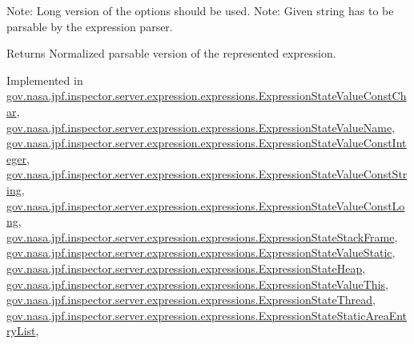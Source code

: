 Note\+: Long version of the options should be used. Note\+: Given string has to be parsable by the expression parser.

\begin{DoxyReturn}{Returns}
Normalized parsable version of the represented expression. 
\end{DoxyReturn}


Implemented in \hyperlink{classgov_1_1nasa_1_1jpf_1_1inspector_1_1server_1_1expression_1_1expressions_1_1_expression_state_value_const_char_a8b8dbff87c3f81b9192355201350b701}{gov.\+nasa.\+jpf.\+inspector.\+server.\+expression.\+expressions.\+Expression\+State\+Value\+Const\+Char}, \hyperlink{classgov_1_1nasa_1_1jpf_1_1inspector_1_1server_1_1expression_1_1expressions_1_1_expression_state_value_name_a7dba9eb7d3fe67b1be856b7c890d14fd}{gov.\+nasa.\+jpf.\+inspector.\+server.\+expression.\+expressions.\+Expression\+State\+Value\+Name}, \hyperlink{classgov_1_1nasa_1_1jpf_1_1inspector_1_1server_1_1expression_1_1expressions_1_1_expression_state_value_const_integer_a49ccad06fcf3443c4f1a0306a007f320}{gov.\+nasa.\+jpf.\+inspector.\+server.\+expression.\+expressions.\+Expression\+State\+Value\+Const\+Integer}, \hyperlink{classgov_1_1nasa_1_1jpf_1_1inspector_1_1server_1_1expression_1_1expressions_1_1_expression_state_value_const_string_af7e58cc61aa1cc6e4e6b00f55f18c293}{gov.\+nasa.\+jpf.\+inspector.\+server.\+expression.\+expressions.\+Expression\+State\+Value\+Const\+String}, \hyperlink{classgov_1_1nasa_1_1jpf_1_1inspector_1_1server_1_1expression_1_1expressions_1_1_expression_state_value_const_long_afb79a67f6c4892a3a2660e9ef30926b1}{gov.\+nasa.\+jpf.\+inspector.\+server.\+expression.\+expressions.\+Expression\+State\+Value\+Const\+Long}, \hyperlink{classgov_1_1nasa_1_1jpf_1_1inspector_1_1server_1_1expression_1_1expressions_1_1_expression_state_stack_frame_acb8b5f107d7ebab62db22c7b2a9a91b0}{gov.\+nasa.\+jpf.\+inspector.\+server.\+expression.\+expressions.\+Expression\+State\+Stack\+Frame}, \hyperlink{classgov_1_1nasa_1_1jpf_1_1inspector_1_1server_1_1expression_1_1expressions_1_1_expression_state_value_static_ac8bdf9d1b21b32d12a6e6e5279cc70a6}{gov.\+nasa.\+jpf.\+inspector.\+server.\+expression.\+expressions.\+Expression\+State\+Value\+Static}, \hyperlink{classgov_1_1nasa_1_1jpf_1_1inspector_1_1server_1_1expression_1_1expressions_1_1_expression_state_heap_a1c7afc075a378e4a75dc64441f3d8dcb}{gov.\+nasa.\+jpf.\+inspector.\+server.\+expression.\+expressions.\+Expression\+State\+Heap}, \hyperlink{classgov_1_1nasa_1_1jpf_1_1inspector_1_1server_1_1expression_1_1expressions_1_1_expression_state_value_this_af1b579832ec3891431184154c683194a}{gov.\+nasa.\+jpf.\+inspector.\+server.\+expression.\+expressions.\+Expression\+State\+Value\+This}, \hyperlink{classgov_1_1nasa_1_1jpf_1_1inspector_1_1server_1_1expression_1_1expressions_1_1_expression_state_thread_a8e2420c4821522c88896def518d32f4a}{gov.\+nasa.\+jpf.\+inspector.\+server.\+expression.\+expressions.\+Expression\+State\+Thread}, \hyperlink{classgov_1_1nasa_1_1jpf_1_1inspector_1_1server_1_1expression_1_1expressions_1_1_expression_state_static_area_entry_list_adeb7b6c431edf2a46015e3b9a5e6dce6}{gov.\+nasa.\+jpf.\+inspector.\+server.\+expression.\+expressions.\+Expression\+State\+Static\+Area\+Entry\+List}, 